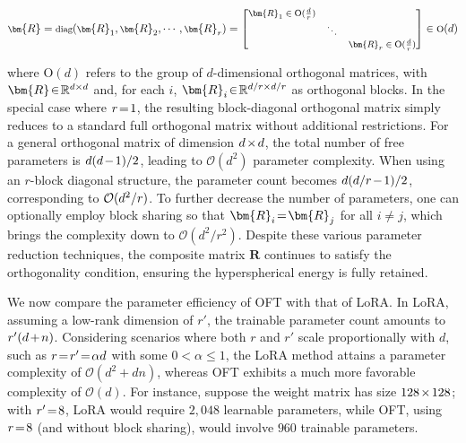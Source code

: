 \begin{equation}
    \footnotesize
    \bm{R}=\text{diag}(\bm{R}_1,\bm{R}_2,\cdots,\bm{R}_r)=\begin{bmatrix}
    \bm{R}_1\in \text{O}(\frac{d}{r}) &  &\\
    &\ddots & \\
    & & \bm{R}_r\in \text{O}(\frac{d}{r})
    \end{bmatrix}\in \text{O}(d)
\end{equation}

where $\text{O}(d)$ refers to the group of $d$-dimensional orthogonal matrices, with $\thickmuskip=2mu \medmuskip=2mu \bm{R} \in \mathbb{R}^{d \times d}$ and, for each $i$, $\thickmuskip=2mu \medmuskip=2mu \bm{R}_i \in \mathbb{R}^{d/r \times d/r}$ as orthogonal blocks. In the special case where $\thickmuskip=2mu \medmuskip=2mu r = 1$, the resulting block-diagonal orthogonal matrix simply reduces to a standard full orthogonal matrix without additional restrictions. For a general orthogonal matrix of dimension $\thickmuskip=2mu \medmuskip=2mu d \times d$, the total number of free parameters is $\thickmuskip=2mu \medmuskip=2mu d(d-1)/2$, leading to $\mathcal{O}(d^2)$ parameter complexity. When using an $r$-block diagonal structure, the parameter count becomes $\thickmuskip=2mu \medmuskip=2mu d(d/r-1)/2$, corresponding to $\thickmuskip=2mu \medmuskip=2mu \mathcal{O}(d^2/r)$. To further decrease the number of parameters, one can optionally employ block sharing so that $\thickmuskip=2mu \medmuskip=2mu \bm{R}_i = \bm{R}_j$ for all $i \neq j$, which brings the complexity down to $\mathcal{O}(d^2/r^2)$. Despite these various parameter reduction techniques, the composite matrix $\bm{R}$ continues to satisfy the orthogonality condition, ensuring the hyperspherical energy is fully retained.

We now compare the parameter efficiency of OFT with that of LoRA. In LoRA, assuming a low-rank dimension of $r'$, the trainable parameter count amounts to $\thickmuskip=2mu \medmuskip=2mu r'(d+n)$. Considering scenarios where both $r$ and $r'$ scale proportionally with $d$, such as $\thickmuskip=2mu \medmuskip=2mu r = r' = \alpha d$ with some $0 < \alpha \leq 1$, the LoRA method attains a parameter complexity of $\mathcal{O}(d^2 + dn)$, whereas OFT exhibits a much more favorable complexity of $\mathcal{O}(d)$. For instance, suppose the weight matrix has size $\thickmuskip=2mu \medmuskip=2mu 128 \times 128$; with $\thickmuskip=2mu \medmuskip=2mu r' = 8$, LoRA would require $2,048$ learnable parameters, while OFT, using $\thickmuskip=2mu \medmuskip=2mu r=8$ (and without block sharing), would involve $960$ trainable parameters.

